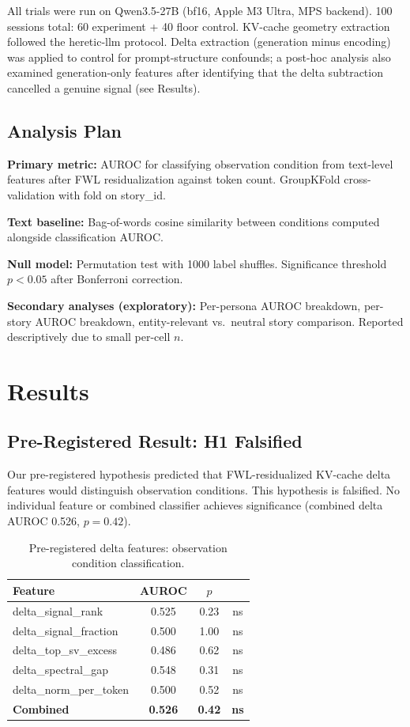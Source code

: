 \documentclass[11pt,a4paper]{article}
\begin{document}
All trials were run on Qwen3.5-27B (bf16, Apple M3 Ultra, MPS backend). 100 sessions total: 60 experiment + 40 floor control. KV-cache geometry extraction followed the heretic-llm protocol. Delta extraction (generation minus encoding) was applied to control for prompt-structure confounds; a post-hoc analysis also examined generation-only features after identifying that the delta subtraction cancelled a genuine signal (see Results).

\subsection{Analysis Plan}

\textbf{Primary metric:} AUROC for classifying observation condition from text-level features after FWL residualization against token count. GroupKFold cross-validation with fold on story\_id.

\textbf{Text baseline:} Bag-of-words cosine similarity between conditions computed alongside classification AUROC.

\textbf{Null model:} Permutation test with 1000 label shuffles. Significance threshold $p < 0.05$ after Bonferroni correction.

\textbf{Secondary analyses (exploratory):} Per-persona AUROC breakdown, per-story AUROC breakdown, entity-relevant vs.\ neutral story comparison. Reported descriptively due to small per-cell $n$.

\section{Results}

\subsection{Pre-Registered Result: H1 Falsified}

Our pre-registered hypothesis predicted that FWL-residualized KV-cache delta features would distinguish observation conditions. This hypothesis is falsified. No individual feature or combined classifier achieves significance (combined delta AUROC 0.526, $p = 0.42$).

\begin{table}[H]
\centering
\caption{Pre-registered delta features: observation condition classification.}
\begin{tabular}{lccc}
\toprule
Feature & AUROC & $p$ & \\
\midrule
delta\_signal\_rank & 0.525 & 0.23 & ns \\
delta\_signal\_fraction & 0.500 & 1.00 & ns \\
delta\_top\_sv\_excess & 0.486 & 0.62 & ns \\
delta\_spectral\_gap & 0.548 & 0.31 & ns \\
delta\_norm\_per\_token & 0.500 & 0.52 & ns \\
\textbf{Combined} & \textbf{0.526} & \textbf{0.42} & \textbf{ns} \\
\bottomrule
\end{tabular}
\end{table}
\end{document}
